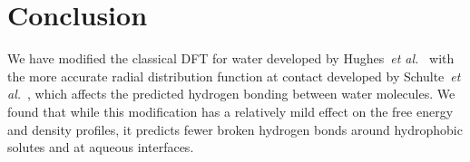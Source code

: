 \documentclass[preprint, endfloats,amsmath,amssymb,jcp]{revtex4-1}
\begin{document}
\section{Conclusion}

We have modified the classical DFT for water developed by
Hughes~\emph{et al.}~\cite{hughes2013classical} with the more accurate
radial distribution function at contact developed by Schulte~\emph{et
  al.}~\cite{schulte2012using}, which affects the predicted hydrogen
bonding between water molecules.  We found that while this
modification has a relatively mild effect on the free energy and
density profiles, it predicts fewer broken hydrogen bonds around
hydrophobic solutes and at aqueous interfaces.

\end{document}
